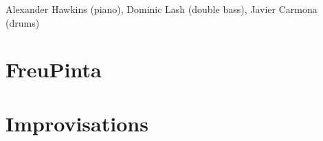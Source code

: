 Alexander Hawkins (piano), Dominic Lash (double bass), Javier Carmona (drums)

\section{FreuPinta}


\section{Improvisations}


\label{ch:compositions}